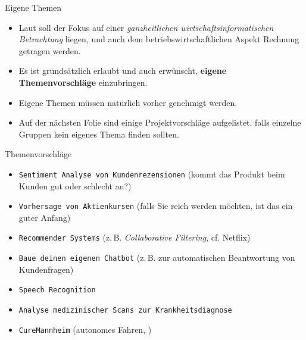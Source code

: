 \begin{dwHeaderFrame}{Eigene Themen}
	\begin{itemize}
		\item Laut \modulkatalog{} soll der Fokus auf einer \textit{\glqq{}ganzheitlichen wirtschaftsinformatischen Betrachtung\grqq{}} liegen,
			und auch dem betriebswirtschaftlichen Aspekt Rechnung getragen werden.
		\item Es ist grundsätzlich erlaubt und auch erwünscht, \textbf{eigene Themenvorschläge} einzubringen.
		\item Eigene Themen müssen natürlich vorher genehmigt werden.
		\item Auf der nächsten Folie sind einige Projektvorschläge aufgelistet, falls einzelne Gruppen kein eigenes Thema finden sollten.
	\end{itemize}
\end{dwHeaderFrame}

\begin{dwHeaderFrame}{Themenvorschläge}
	\begin{itemize} 
		\item \texttt{Sentiment Analyse von Kundenrezensionen} (kommt das Produkt beim Kunden gut oder schlecht an?)
		\item \texttt{Vorhersage von Aktienkursen} (falls Sie reich werden möchten, ist das ein guter Anfang)
		\item \texttt{Recommender Systems} (z.\,B. \textit{Collaborative Filtering}, cf. Netflix)
		\item \texttt{Baue deinen eigenen Chatbot} (z.\,B. zur automatischen Beantwortung von Kundenfragen)
		\item \texttt{Speech Recognition}
		\item \texttt{Analyse medizinischer Scans zur Krankheitsdiagnose}
		\item \texttt{CureMannheim} (autonomes Fahren, \curemannheim)
	\end{itemize}
\end{dwHeaderFrame}


\makethanks

